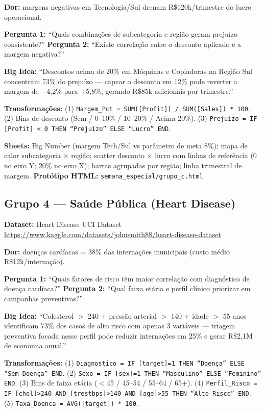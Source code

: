 \textbf{Dor:} margens negativas em Tecnologia/Sul drenam R\$120k/trimestre do lucro operacional.

\textbf{Pergunta 1:} ``Quais combinações de subcategoria e região geram prejuízo consistente?'' \quad \textbf{Pergunta 2:} ``Existe correlação entre o desconto aplicado e a margem negativa?''

\textbf{Big Idea:} ``Descontos acima de 20\% em Máquinas e Copiadoras na Região Sul concentram 73\% do prejuízo --- capear o desconto em 12\% pode reverter a margem de $-$4,2\% para $+$5,8\%, gerando R\$85k adicionais por trimestre.''

\textbf{Transformações:} (1) \texttt{Margem\_Pct = SUM([Profit]) / SUM([Sales]) * 100}. (2) Bins de desconto (Sem / 0--10\% / 10--20\% / Acima 20\%). (3) \texttt{Prejuizo = IF [Profit] < 0 THEN ``Prejuízo'' ELSE ``Lucro'' END}.

\textbf{Sheets:} Big Number (margem Tech/Sul vs parâmetro de meta 8\%); mapa de calor subcategoria $\times$ região; scatter desconto $\times$ lucro com linhas de referência (0 no eixo Y; 20\% no eixo X); barras agrupadas por região; linha trimestral de margem. \textbf{Protótipo HTML:} \texttt{semana\_especial/grupo\_c.html}.

\subsection{Grupo 4 --- Saúde Pública (Heart Disease)}

\textbf{Dataset:} Heart Disease UCI Dataset\\
\url{https://www.kaggle.com/datasets/johnsmith88/heart-disease-dataset}

\textbf{Dor:} doenças cardíacas = 38\% das internações municipais (custo médio R\$12k/internação).

\textbf{Pergunta 1:} ``Quais fatores de risco têm maior correlação com diagnóstico de doença cardíaca?'' \quad \textbf{Pergunta 2:} ``Qual faixa etária e perfil clínico priorizar em campanhas preventivas?''

\textbf{Big Idea:} ``Colesterol $>$ 240 + pressão arterial $>$ 140 + idade $>$ 55 anos identificam 73\% dos casos de alto risco com apenas 3 variáveis --- triagem preventiva focada nesse perfil pode reduzir internações em 25\% e gerar R\$2,1M de economia anual.''

\textbf{Transformações:} (1) \texttt{Diagnostico = IF [target]=1 THEN ``Doença'' ELSE ``Sem Doença'' END}. (2) \texttt{Sexo = IF [sex]=1 THEN ``Masculino'' ELSE ``Feminino'' END}. (3) Bins de faixa etária ($<$45 / 45--54 / 55--64 / 65+). (4) \texttt{Perfil\_Risco = IF [chol]>240 AND [trestbps]>140 AND [age]>55 THEN ``Alto Risco'' END}. (5) \texttt{Taxa\_Doenca = AVG([target]) * 100}.

